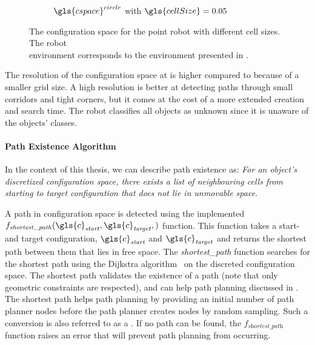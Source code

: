 \begin{figure}[H]
\begin{subfigure}{.49\textwidth}
    \caption{$\gls{cspace}^{circle}$ with $\gls{cellSize} = 0.05$}%
    \label{fig:c_space_two_pushes_smaller}
  \end{subfigure}
  \caption{The configuration space for the point robot with different cell sizes. The robot\\environment corresponds to the environment presented in .}%
  \label{fig:two_pushes_to_freedom_conf_space}
\end{figure}

The resolution of the configuration space at  is higher compared to  because of a smaller grid size. A high resolution is better at detecting paths through small corridors and tight corners, but it comes at the cost of a more extended creation and search time. The robot classifies all objects as unknown since it is unaware of the objects' classes.\bs

\paragraph{Path Existence Algorithm} In the context of this thesis, we can describe path existence as: \textit{For an object's discretized configuration space, there exists a list of neighbouring cells from starting to target configuration that does not lie in unmovable space.\bs}

A path in configuration space is detected using the implemented\\$f_\mathit{shortest\_path}(\gls{c}_\mathit{start}, \gls{c}_\mathit{target}, )$ function. This function takes a start- and target configuration, $\gls{c}_\mathit{start}$ and $\gls{c}_\mathit{target}$ and returns the shortest path between them that lies in free space. The \textit{shortest\_path} function searches for the shortest path using the Dijkstra algorithm~\cite{dijkstra_note_1959} on the discreted configuration space. The shortest path validates the existence of a path (note that only geometric constraints are respected), and can help path planning discussed in . The shortest path helps path planning by providing an initial number of path planner nodes before the path planner creates nodes by random sampling. Such a conversion is also referred to as a . If no path can be found, the $f_\textit{shortest\_path}$ function raises an error that will prevent path planning from occurring.\bs

